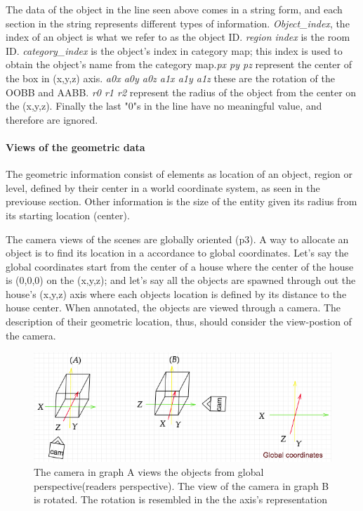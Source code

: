 The data of the object in the line seen above comes in a string form, and each section in the string represents different types of information. \textit{Object\_index}, the index of an object is what we refer to as the object ID. \textit{region index} is the room ID. \textit{category\_index} is the object's index in category map; this index is used to obtain the object's name from the category map.\textit{px py pz} represent the center of the box in (x,y,z) axis. \textit{a0x a0y a0z  a1x a1y a1z} these are the rotation of the OOBB and AABB. \textit{r0 r1 r2} represent the radius of the object from the center on the (x,y,z). Finally the last "0"s in the line have no meaningful value, and therefore are ignored. 

\paragraph{Views of the geometric data}

 The geometric information consist of elements as location of an object, region or level, defined by their center in a world coordinate system, as seen in the previouse section. Other information is the size of the entity given its radius from its starting location (center).   

The camera views of the scenes are globally oriented \cite{Matterport3D}(p3). A way to allocate an object is to find its location in a accordance to global coordinates. Let's say the global coordinates start from the center of a house where the center of the house is (0,0,0) on the (x,y,z); and let's say all the objects are spawned through out the house's (x,y,z) axis where each objects location is defined by its distance to the house center. When annotated, the objects are viewed through a camera. The description of their geometric location, thus, should consider the view-postion of the camera. 

\begin{figure}[H]
\centering
\includegraphics[scale=0.53]{images/campos.png}
\caption{The camera in graph A views the objects from global perspective(readers perspective). The view of the camera in graph B is rotated. The rotation is resembled in the the axis's representation }
\label{fig:campos}
\end{figure}


